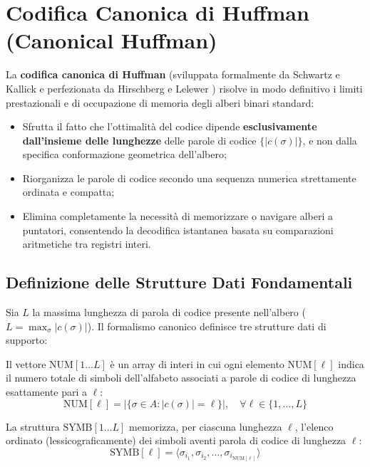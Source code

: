 \FloatBarrier
\section{Codifica Canonica di Huffman (Canonical Huffman)}
\label{sec:codifica-canonica-huffman}

La \textbf{codifica canonica di Huffman} (sviluppata formalmente da Schwartz e Kallick e perfezionata da Hirschberg e Lelewer \cite{hirschberg1990, moffat1997}) risolve in modo definitivo i limiti prestazionali e di occupazione di memoria degli alberi binari standard:
\begin{itemize}
  \item Sfrutta il fatto che l'ottimalit\`a del codice dipende \textbf{esclusivamente dall'insieme delle lunghezze} delle parole di codice $\{\vert c(\sigma) \vert\}$, e non dalla specifica conformazione geometrica dell'albero;
  \item Riorganizza le parole di codice secondo una sequenza numerica strettamente ordinata e compatta;
  \item Elimina completamente la necessit\`a di memorizzare o navigare alberi a puntatori, consentendo la decodifica istantanea basata su comparazioni aritmetiche tra registri interi.
\end{itemize}

\FloatBarrier
\subsection{Definizione delle Strutture Dati Fondamentali}
\label{subsec:strutture-dati-canonica}

Sia $L$ la massima lunghezza di parola di codice presente nell'albero ($L = \max_{\sigma} \vert c(\sigma) \vert$). Il formalismo canonico definisce tre strutture dati di supporto:

\begin{definition}
Il vettore $\text{NUM}[1 \dots L]$ \`e un array di interi in cui ogni elemento $\text{NUM}[\ell]$ indica il numero totale di simboli dell'alfabeto associati a parole di codice di lunghezza esattamente pari a $\ell$:
\begin{equation}
  \text{NUM}[\ell] = \big\vert \{ \sigma \in A : \vert c(\sigma) \vert = \ell \} \big\vert, \quad \forall \ell \in \{1, \dots, L\}
\end{equation}
\end{definition}

\begin{definition}
La struttura $\text{SYMB}[1 \dots L]$ memorizza, per ciascuna lunghezza $\ell$, l'elenco ordinato (lessicograficamente) dei simboli aventi parola di codice di lunghezza $\ell$:
\begin{equation}
  \text{SYMB}[\ell] = \langle \sigma_{i_1}, \sigma_{i_2}, \dots, \sigma_{i_{\text{NUM}[\ell]}} \rangle
\end{equation}
\end{definition}

